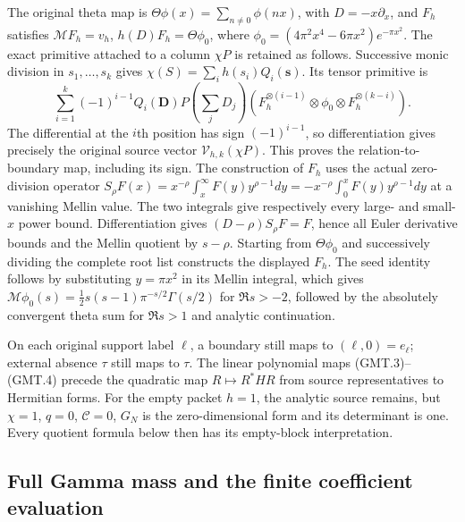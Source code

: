 The original theta map is $\Theta\phi(x)=\sum_{n\ne0}\phi(nx)$,
with $D=-x\partial_x$, and $F_h$ satisfies
$\mathcal MF_h=v_h$, $h(D)F_h=\Theta\phi_0$, where
$\phi_0=(4\pi^2x^4-6\pi x^2)e^{-\pi x^2}$.
The exact primitive attached to a column $\chi P$ is retained as follows.
Successive monic division in $s_1,\ldots,s_k$ gives
$\chi(S)=\sum_i h(s_i)Q_i(\mathbf s)$. Its tensor primitive is
\[
 \sum_{i=1}^k(-1)^{i-1}Q_i(\mathbf D)P(\textstyle\sum_jD_j)
 (F_h^{\otimes(i-1)}\otimes\phi_0\otimes
                F_h^{\otimes(k-i)}).                           \tag{GMT.4}
\]
The differential at the $i$th position has sign $(-1)^{i-1}$,
so differentiation gives precisely the original source vector
$\mathcal V_{h,k}(\chi P)$. This proves the relation-to-boundary
map, including its sign. The construction of $F_h$ uses the actual
zero-division operator
$S_\rho F(x)=x^{-\rho}\int_x^\infty F(y)y^{\rho-1}dy
=-x^{-\rho}\int_0^xF(y)y^{\rho-1}dy$ at a vanishing Mellin value.
The two integrals give respectively every large- and small-$x$ power
bound. Differentiation gives $(D-\rho)S_\rho F=F$, hence all Euler
derivative bounds and the Mellin quotient by $s-\rho$.
Starting from $\Theta\phi_0$ and successively dividing the complete
root list constructs the displayed $F_h$. The seed identity follows
by substituting $y=\pi x^2$ in its Mellin integral, which gives
$\mathcal M\phi_0(s)=\tfrac12s(s-1)\pi^{-s/2}\Gamma(s/2)$
for $\Re s>-2$, followed by the absolutely convergent theta sum
for $\Re s>1$ and analytic continuation.

On each original support label $\ell$, a boundary still maps to
$(\ell,0)=e_\ell$; external absence $\tau$ still maps to $\tau$.
The linear polynomial maps (GMT.3)--(GMT.4) precede the quadratic map
$R\mapsto R^*H R$ from source representatives to Hermitian forms.
For the empty packet $h=1$, the analytic source remains, but
$\chi=1$, $q=0$, $\mathcal C=0$, $G_N$ is the zero-dimensional
form and its determinant is one. Every quotient formula below then
has its empty-block interpretation.

\subsection{Full Gamma mass and the finite coefficient evaluation}

